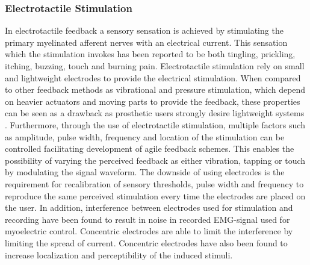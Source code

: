 \subsubsection{Electrotactile Stimulation} \label{E-stim}

In electrotactile feedback a sensory sensation is achieved by stimulating the primary myelinated afferent nerves with an electrical current. This sensation which the stimulation invokes has been reported to be both tingling, prickling, itching, buzzing, touch and burning pain. \cite{Schofield2014} Electrotactile stimulation rely on small and lightweight electrodes to provide the electrical stimulation. When compared to other feedback methods as vibrational and pressure stimulation, which depend on heavier actuators and moving parts to provide the feedback, these properties can be seen as a drawback as prosthetic users strongly desire lightweight systems \cite{Stephens-Fripp2018,Benz2016}. Furthermore, through the use of electrotactile stimulation, multiple factors such as amplitude, pulse width, frequency and location of the stimulation can be controlled facilitating development of agile feedback schemes. This enables the possibility of varying the perceived feedback as either vibration, tapping or touch by modulating the signal waveform. The downside of using electrodes is the requirement for recalibration of sensory thresholds, pulse width and frequency to reproduce the same perceived stimulation every time the electrodes are placed on the user. In addition, interference between electrodes used for stimulation and recording have been found to result in noise in recorded EMG-signal used for myoelectric control. Concentric electrodes are able to limit the interference by limiting the spread of current. Concentric electrodes have also been found to increase localization and perceptibility of the induced stimuli. \cite{Schofield2014,Stephens-Fripp2018,Antfolk2018} 







